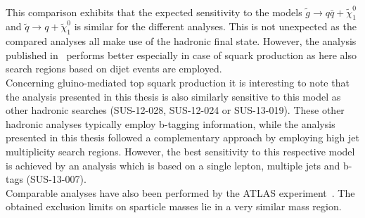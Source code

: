 \\
This comparison exhibits that the expected sensitivity to the models $\tilde{g} \rightarrow q\bar{q} + \tilde{\chi}_1^0$ and $\tilde{q} \rightarrow q + \tilde{\chi}_1^0$ is similar for the different analyses. This is not unexpected as the compared analyses all make use of the hadronic final state. However, the analysis published in~\cite{CMS-PAS-SUS-13-019} performs better especially in case of squark production as here also search regions based on dijet events are employed. \\
Concerning gluino-mediated top squark production it is interesting to note that the analysis presented in this thesis is also similarly sensitive to this model as other hadronic searches (\cf SUS-12-028, SUS-12-024 or SUS-13-019). These other hadronic analyses typically employ b-tagging information, while the analysis presented in this thesis followed a complementary approach by employing high jet multiplicity search regions. However, the best sensitivity to this respective model is achieved by an analysis which is based on a single lepton, multiple jets and b-tags (SUS-13-007). 
\\
Comparable analyses have also been performed by the ATLAS experiment~\cite{Aad:2013wta, Aad:2014wea, Aad:2014lra}. The obtained exclusion limits on sparticle masses lie in a very similar mass region.

